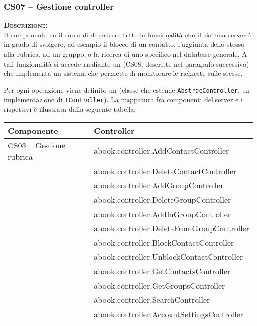 
\subsubsection{CS07 -- Gestione controller}\label{sec:cs07}
\begin{description}
	\item{\scshape\bfseries Descrizione:}\\
Il componente ha il ruolo di descrivere tutte le funzionalità che il sistema server è in grado di svolgere, ad esempio il blocco di un contatto, l'aggiunta dello stesso alla rubrica, ad un gruppo, o la ricerca di uno specifico nel database generale. A tali funzionalità si accede mediante un  (CS08, descritto nel paragrafo successivo) che implementa un sistema che permette di monitorare le richieste sulle stesse.

Per ogni operazione viene definito un  (classe che estende \texttt{AbstracController}, un implementazione di \texttt{IController}). La mappatura fra componenti del server e i rispettivi  è illustrata dalla seguente tabella:

\begin{center}
\begin{tabular}{>{\sffamily}l>{\ttfamily}p{}}
\toprule
\textbf{\rmfamily Componente} & \textbf{\rmfamily Controller}\\
\midrule
CS03 -- Gestione rubrica 


& abook.controller.AddContactController\\
& abook.controller.DeleteContactController\\
& abook.controller.AddGroupController\\
& abook.controller.DeleteGroupController\\
& abook.controller.AddInGroupController\\
& abook.controller.DeleteFromGroupController\\
& abook.controller.BlockContactController\\
& abook.controller.UnblockContactController\\
& abook.controller.GetContactsController\\
& abook.controller.GetGroupsController\\
& abook.controller.SearchController\\
& abook.controller.AccountSettingsController\\



\end{tabular}
\end{center}
\end{description}
